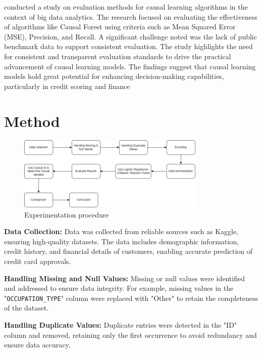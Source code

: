 \documentclass[12pt]{report}
\begin{document}
     conducted a study on evaluation methods for causal learning algorithms in the context of big data analytics. The research focused on evaluating the effectiveness of algorithms like Causal Forest using criteria such as Mean Squared Error (MSE), Precision, and Recall. A significant challenge noted was the lack of public benchmark data to support consistent evaluation. The study highlights the need for consistent and transparent evaluation standards to drive the practical advancement of causal learning models. The findings suggest that causal learning models hold great potential for enhancing decision-making capabilities, particularly in credit scoring and finance

    \chapter{Method}

    \begin{figure}[h]
        \centering
        \includegraphics[width=0.8\textwidth]{resources/pic/Experimentation procedure.png}
        \caption{Experimentation procedure}
        \label{fig:Experimentation procedure}
    \end{figure}

    {\bfseries Data Collection:} Data was collected from reliable sources such as Kaggle, ensuring high-quality datasets. The data includes demographic information, credit history, and financial details of customers, enabling accurate prediction of credit card approvals.

    {\bfseries Handling Missing and Null Values:} Missing or null values were identified and addressed to ensure data integrity. For example, missing values in the "\texttt{OCCUPATION\_TYPE}" column were replaced with "Other" to retain the completeness of the dataset.

    {\bfseries Handling Duplicate Values:} Duplicate entries were detected in the "ID" column and removed, retaining only the first occurrence to avoid redundancy and ensure data accuracy.
\end{document}
